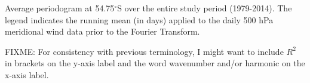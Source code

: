 \label{fig:fourier_spectrum}
Average periodogram at 54.75$^{\circ}$S over the entire study period (1979-2014). The legend indicates the running mean (in days) applied to the daily 500 hPa meridional wind data prior to the Fourier Transform. 

FIXME: For consistency with previous terminology, I might want to include $R^2$ in brackets on the y-axis label and the word wavenumber and/or harmonic on the x-axis label.
